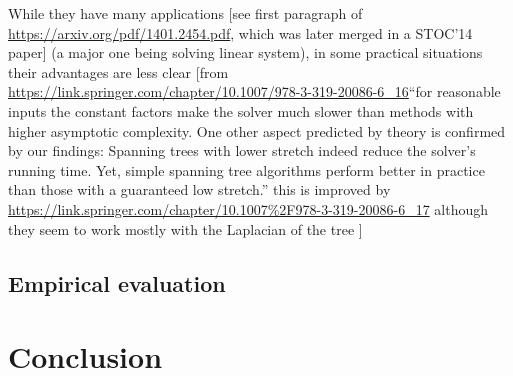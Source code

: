 \documentclass[nobib, a4paper, 10pt, oneside, onecolumn, openany, notitlepage, final,
svgnames, marginals=raggedouter, english,
]{article}
\begin{document}
While they have many applications [see first paragraph of \url{https://arxiv.org/pdf/1401.2454.pdf},
which was later merged in a STOC'14 paper] (a major one being solving linear system), in some
practical situations their advantages are less clear [from
\url{https://link.springer.com/chapter/10.1007/978-3-319-20086-6_16}\enquote{for reasonable inputs
the constant factors make the solver much slower than methods with higher asymptotic complexity.
One other aspect predicted by theory is confirmed by our findings: Spanning trees with lower
stretch indeed reduce the solver's running time. Yet, simple spanning tree algorithms perform
better in practice than those with a guaranteed low stretch.} this is improved by
\url{https://link.springer.com/chapter/10.1007%2F978-3-319-20086-6_17} although they seem to work
	mostly with the Laplacian of the tree ]
\fi

\subsection{Empirical evaluation}
\label{sub:gtx_empirical_evaluation}

% 

\section{Conclusion}


\begingroup
\small
{}
\todos

\setlength\bibitemsep{2pt}
\printbibliography
\endgroup

% 
% 
\end{document}

